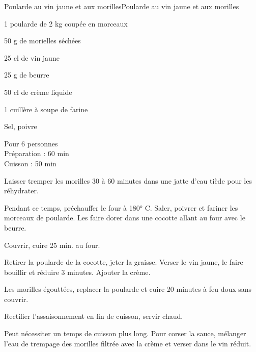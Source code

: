 \begin{recette}{Poularde au vin jaune et aux morilles}{Poularde au vin jaune et aux morilles}

\begin{ingredients}
1 poularde de 2 kg coupée en morceaux\par
50 g de morielles séchées\par
25 cl de vin jaune\par
25 g de beurre\par
50 cl de crème liquide\par
1 cuillère à soupe de farine\par
Sel, poivre\par
\end{ingredients}

\begin{infos}
Pour 6 personnes\\
Préparation : 60 min\\
Cuisson : 50 min\\
\end{infos}

\begin{etapes}
\item Laisser tremper les morilles 30 à 60 minutes dans une jatte d'eau tiède pour les réhydrater.
\item Pendant ce temps, préchauffer le four à 180° C. Saler, poivrer et fariner les morceaux de poularde. Les faire dorer dans une cocotte allant au four avec le beurre.
\item Couvrir, cuire 25 min. au four.
\item Retirer la poularde de la cocotte, jeter la graisse. Verser le vin jaune, le faire bouillir et réduire 3 minutes. Ajouter la crème.
\item Les morilles égouttées, replacer la poularde et cuire 20 minutes à feu doux sans couvrir.
\item Rectifier l'assaisonnement en fin de cuisson, servir chaud.
\end{etapes}

\begin{conseils}
Peut nécessiter un temps de cuisson plus long. Pour corser la sauce, mélanger l'eau de trempage des morilles filtrée avec la crème et verser dans le vin réduit.
\end{conseils}

\end{recette}